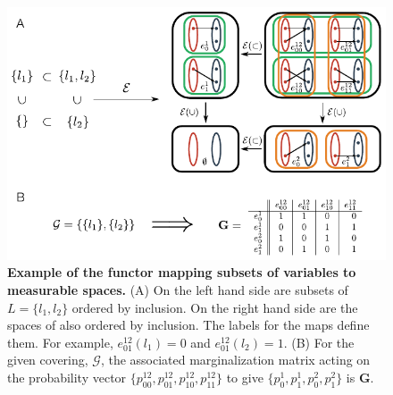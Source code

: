 
\FloatBarrier
\pagebreak

\begin{figure}[!ht]
\centering
\noindent\includegraphics[width=0.8\columnwidth]{fig/efunctor.pdf}
\caption{{\bf Example of the functor mapping subsets of variables to measurable spaces.} (A) On the left hand side are subsets of $L=\{l_1,l_2\}$ ordered by inclusion. On the right hand side are the spaces of \gnpm{} also ordered by inclusion. The labels for the maps define them. For example, $e^{12}_{01}(l_1) = 0$ and $e^{12}_{01}(l_2) = 1$. (B) For the given covering, $\mathcal{G}$, the associated marginalization matrix acting on the probability vector $\{ p^{12}_{00},p^{12}_{01},p^{12}_{10},p^{12}_{11} \}$ to give $\{ p^{1}_{0},p^{1}_{1},p^{2}_{0},p^{2}_{1} \}$ is $\mathbf{G}$.}
\label{fig:efunctor}
\end{figure}

\pagebreak

